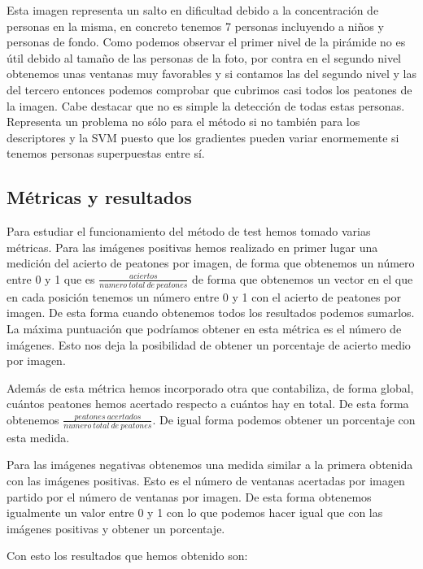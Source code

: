 \documentclass[a4paper,12pt]{article}
\begin{document}
Esta imagen representa un salto en dificultad debido a la concentración de personas en la misma, en concreto tenemos 7 personas incluyendo a niños y personas de fondo. Como podemos observar el primer nivel de la pirámide no es útil debido al tamaño de las personas de la foto, por contra en el segundo nivel obtenemos unas ventanas muy favorables y si contamos las del segundo nivel y las del tercero entonces podemos comprobar que cubrimos casi todos los peatones de la imagen. Cabe destacar que no es simple la detección de todas estas personas. Representa un problema no sólo para el método si no también para los descriptores y la SVM puesto que los gradientes pueden variar enormemente si tenemos personas superpuestas entre sí.

\subsection{Métricas y resultados}

Para estudiar el funcionamiento del método de test hemos tomado varias métricas. Para las imágenes positivas hemos realizado en primer lugar una medición del acierto de peatones por imagen, de forma que obtenemos un número entre 0 y 1 que es $\frac{aciertos}{numero \ total \ de \ peatones}$ de forma que obtenemos un vector en el que en cada posición tenemos un número entre 0 y 1 con el acierto de peatones por imagen. De esta forma cuando obtenemos todos los resultados podemos sumarlos. La máxima puntuación que podríamos obtener en esta métrica es el número de imágenes. Esto nos deja la posibilidad de obtener un porcentaje de acierto medio por imagen. 

Además de esta métrica hemos incorporado otra que contabiliza, de forma global, cuántos peatones hemos acertado respecto a cuántos hay en total. De esta forma obtenemos $\frac{peatones \ acertados}{numero \ total \ de \ peatones}$. De igual forma podemos obtener un porcentaje con esta medida.

Para las imágenes negativas obtenemos una medida similar a la primera obtenida con las imágenes positivas. Esto es el número de ventanas acertadas por imagen partido por el número de ventanas por imagen. De esta forma obtenemos igualmente un valor entre 0 y 1 con lo que podemos hacer igual que con las imágenes positivas y obtener un porcentaje. 

Con esto los resultados que hemos obtenido son:

\end{document}
